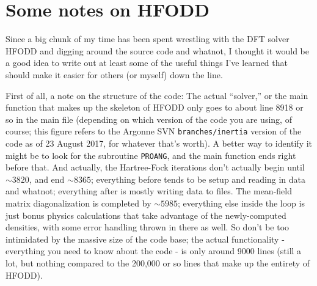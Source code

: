 \chapter{Some notes on HFODD}

Since a big chunk of my time has been spent wrestling with the DFT solver HFODD and digging around the source code and whatnot, I thought it would be a good idea to write out at least some of the useful things I've learned that should make it easier for others (or myself) down the line.

First of all, a note on the structure of the code: The actual ``solver,'' or the main function that makes up the skeleton of HFODD only goes to about line 8918 or so in the main file (depending on which version of the code you are using, of course; this figure refers to the Argonne SVN \texttt{branches/inertia} version of the code as of 23 August 2017, for whatever that's worth). A better way to identify it might be to look for the subroutine \texttt{PROANG}, and the main function ends right before that. And actually, the Hartree-Fock iterations don't actually begin until $\sim3820$, and end $\sim8365$; everything before tends to be setup and reading in data and whatnot; everything after is mostly writing data to files. The mean-field matrix diagonalization is completed by $\sim5985$; everything else inside the loop is just bonus physics calculations that take advantage of the newly-computed densities, with some error handling thrown in there as well. So don't be too intimidated by the massive size of the code base; the actual functionality - everything you need to know about the code - is only around 9000 lines (still a lot, but nothing compared to the 200,000 or so lines that make up the entirety of HFODD).